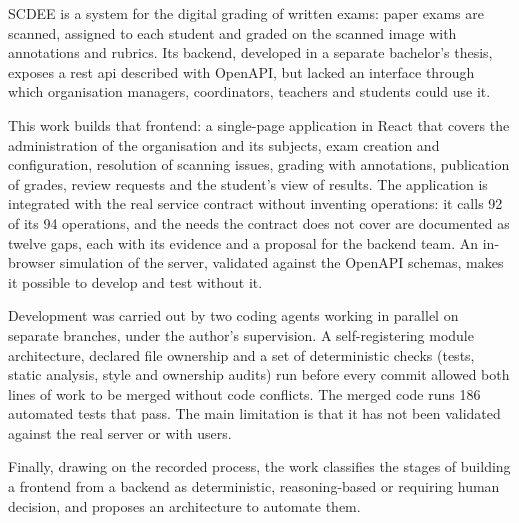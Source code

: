 SCDEE is a system for the digital grading of written exams: paper exams are scanned,
assigned to each student and graded on the scanned image with annotations and rubrics. Its
backend, developed in a separate bachelor's thesis, exposes a \acs{rest} \acs{api}
described with OpenAPI, but lacked an interface through which organisation managers,
coordinators, teachers and students could use it.

This work builds that frontend: a single-page application in React that covers the
administration of the organisation and its subjects, exam creation and configuration,
resolution of scanning issues, grading with annotations, publication of grades, review
requests and the student's view of results. The application is integrated with the real
service contract without inventing operations: it calls 92 of its 94 operations, and the
needs the contract does not cover are documented as twelve gaps, each with its evidence and
a proposal for the backend team. An in-browser simulation of the server, validated against
the OpenAPI schemas, makes it possible to develop and test without it.

Development was carried out by two coding agents working in parallel on separate
branches, under the author's supervision. A self-registering module architecture, declared
file ownership and a set of deterministic checks (tests, static analysis, style and
ownership audits) run before every commit allowed both lines of work to be merged without
code conflicts. The merged code runs 186 automated tests that pass. The main limitation is
that it has not been validated against the real server or with users.

Finally, drawing on the recorded process, the work classifies the stages of building a
frontend from a backend as deterministic, reasoning-based or requiring human decision, and
proposes an architecture to automate them.
